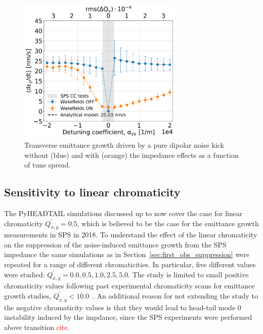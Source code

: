 \begin{figure}[!h] %
    \centering         
    \includegraphics[width=0.7\textwidth]{images/Ch7/deyRates_final_2018_PN_sps_270GeV_DipoleNoiseSQRT1e-8_y-plane_QpxQpy5e-1_6D_Nb5e5_intensity3e10_ayyScan_wakesON_vs_OFF_vs_TuneSpreadvsExpectedSPS.png}
        \caption{Transverse emittance growth driven by a pure dipolar noise kick without (blue) and with (orange) the impedance effects as a function of tune spread.}
        \label{fig:study_5_dipole_noise}
 \end{figure}

\subsection{Sensitivity to linear chromaticity}\label{subsec:chroma_scan}
The PyHEADTAIL simulations discussed up to now cover the case for linear chromaticity $Q^\prime_{x,y}=0.5$, which is believed to be the case for the emittance growth measurements in SPS in 2018. To understand the effect of the linear chromaticity on the suppression of the noise-induced emittance growth from the SPS impedance the same simulations as in Section~\ref{sec:first_obs_suppression} were repeated for a range of different chromaticities. In particular, five different values were studied: $Q^\prime_{x,y}=0.0, 0.5, 1.0, 2.5, 5.0$. The study is limited to small positive chromaticity values following past experimental chromaticity scans for emittance growth studies,  $Q^\prime_{x,y}< 10.0$~\cite{Antoniou:2649815, Calaga:1451286}. An additional reason for not extending the study to the negative chromaticity values is that they would lead to head-tail mode 0 instability induced by the impdance, since the SPS experiments were performed above transition \textcolor{red}{cite}.

